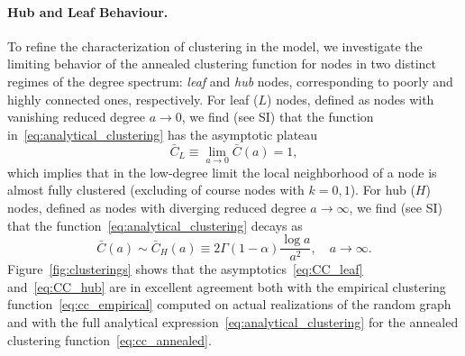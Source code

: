 \documentclass[ twocolumn,
 amsmath,amssymb,
 aps, pre, amsthm, amsfonts,
]{revtex4-2}
\begin{document}
\paragraph*{Hub and Leaf Behaviour.}
To refine the characterization of clustering in the model, we investigate the limiting behavior of the annealed clustering function for nodes in two distinct regimes of the degree spectrum: \emph{leaf} and \emph{hub} nodes, corresponding to poorly and highly connected ones, respectively. 
For leaf ($L$) nodes, defined as nodes with vanishing reduced degree $a \to 0$, we find (see SI) that the function in~\eqref{eq:analytical_clustering} has the asymptotic plateau 
\begin{equation}
    \bar{C}_L \equiv \lim_{a \to 0} \bar{C}(a) = 1,
    \label{eq:CC_leaf}
\end{equation}
which implies that in the low-degree limit the local neighborhood of a node is almost fully clustered (excluding of course nodes with $k=0,1$).
For hub ($H$) nodes, defined as nodes with diverging reduced degree $a \to \infty$, we find (see SI) that the function~\eqref{eq:analytical_clustering} decays as
\begin{equation}
    \bar{C}(a) \sim \bar{C}_{H}(a) \equiv 2 \Gamma(1-\alpha)\frac{\log a}{a^2},\quad a\to\infty.
    \label{eq:CC_hub}
\end{equation}
Figure~\ref{fig:clusterings} shows that the asymptotics~\eqref{eq:CC_leaf} and~\eqref{eq:CC_hub} are in excellent agreement both with  the empirical clustering function~\eqref{eq:cc_empirical} computed on actual realizations of the random graph and with the full analytical expression~\eqref{eq:analytical_clustering} for the annealed clustering function~\eqref{eq:cc_annealed}.
\end{document}
